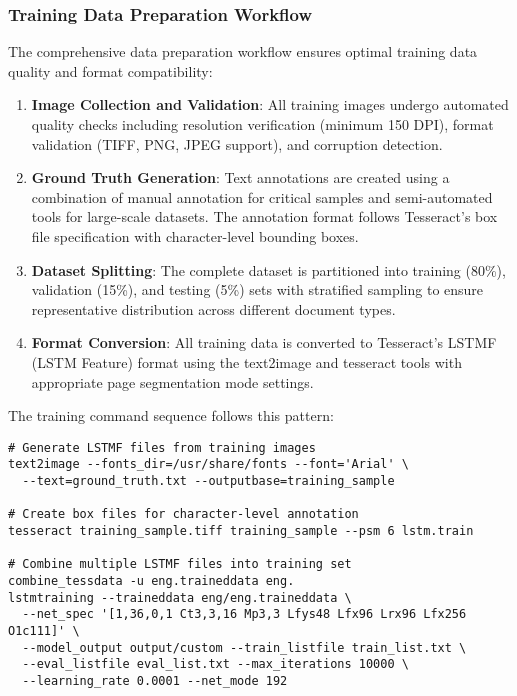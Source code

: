 \subsubsection{Training Data Preparation Workflow}

The comprehensive data preparation workflow ensures optimal training data quality and format compatibility:

\begin{enumerate}
\item \textbf{Image Collection and Validation}: All training images undergo automated quality checks including resolution verification (minimum 150 DPI), format validation (TIFF, PNG, JPEG support), and corruption detection.

\item \textbf{Ground Truth Generation}: Text annotations are created using a combination of manual annotation for critical samples and semi-automated tools for large-scale datasets. The annotation format follows Tesseract's box file specification with character-level bounding boxes.

\item \textbf{Dataset Splitting}: The complete dataset is partitioned into training (80\%), validation (15\%), and testing (5\%) sets with stratified sampling to ensure representative distribution across different document types.

\item \textbf{Format Conversion}: All training data is converted to Tesseract's LSTMF (LSTM Feature) format using the text2image and tesseract tools with appropriate page segmentation mode settings.
\end{enumerate}

The training command sequence follows this pattern:

\begin{verbatim}
# Generate LSTMF files from training images
text2image --fonts_dir=/usr/share/fonts --font='Arial' \
  --text=ground_truth.txt --outputbase=training_sample

# Create box files for character-level annotation
tesseract training_sample.tiff training_sample --psm 6 lstm.train

# Combine multiple LSTMF files into training set
combine_tessdata -u eng.traineddata eng.
lstmtraining --traineddata eng/eng.traineddata \
  --net_spec '[1,36,0,1 Ct3,3,16 Mp3,3 Lfys48 Lfx96 Lrx96 Lfx256 O1c111]' \
  --model_output output/custom --train_listfile train_list.txt \
  --eval_listfile eval_list.txt --max_iterations 10000 \
  --learning_rate 0.0001 --net_mode 192
\end{verbatim}

